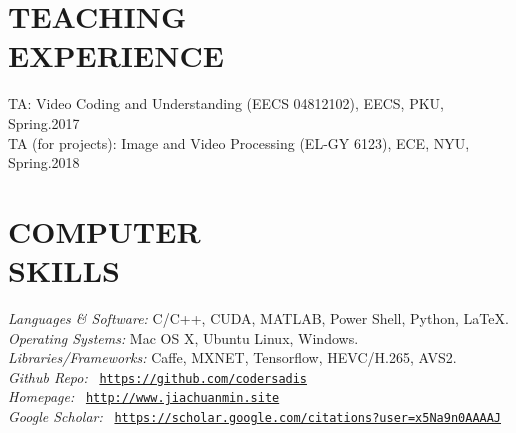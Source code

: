 \documentclass[margin, 10pt]{res} %
\begin{document}
\begin{resume}
\section{TEACHING \\ EXPERIENCE}

TA: Video Coding and Understanding (EECS 04812102), EECS, PKU, \hfill Spring.2017 \\
TA (for projects): Image and Video Processing (EL-GY 6123), ECE, NYU, \hfill Spring.2018 \\



\section{COMPUTER \\ SKILLS}

{\sl Languages \& Software:}
C/C++, CUDA, MATLAB, Power Shell, Python, \LaTeX. \\
{\sl Operating Systems:}
Mac OS X, Ubuntu Linux, Windows. \\
{\sl Libraries/Frameworks:}
Caffe, MXNET, Tensorflow, HEVC/H.265, AVS2. \\
{\sl Github Repo:}
\Pickup~{\href{https://github.com/codersadis}{\texttt{https://github.com/codersadis}}} \\
{\sl Homepage:}
\Pickup~{\href{http://http:www.jiachuanmin.site}{\texttt{http://www.jiachuanmin.site}}} \\
{\sl Google Scholar:}
\Pickup~{\href{https://scholar.google.com/citations?user=x5Na9n0AAAAJ}{\texttt{https://scholar.google.com/citations?user=x5Na9n0AAAAJ}}} \\




\end{resume}
\end{document}
